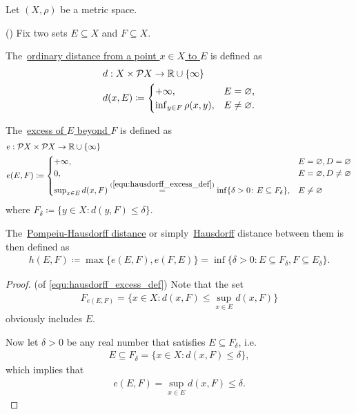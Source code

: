 Let $(X, \rho)$ be a metric space.

\begin{definition}\label{def:hausdorff_distance}(\cite[27]{Dontchev2020})
  Fix two sets $E \subseteq X$ and $F \subseteq X$.

  The~\uline{ordinary distance from a point $x \in X$ to $E$} is defined as
  \begin{align*}
    &d: X \times \mathcal{P} X \to \mathbb{R} \cup \{ \infty \}
    \\
    &d(x, E) \coloneqq \begin{cases}
      +\infty, &E = \varnothing, \\
      \inf_{y \in F} \rho(x, y), &E \neq \varnothing.
    \end{cases}
  \end{align*}

  The~\uline{excess of $E$ beyond $F$} is defined as
  \begin{align}\label{equ:hausdorff_excess_def}
    &e: \PS X \times \PS X \to \R \cup \{ \infty \} \\ \nonumber
    &e(E, F) \coloneqq \begin{cases}
      +\infty, &E = \varnothing, D = \varnothing \\
      0, &E = \varnothing, D \neq \varnothing \\
      \sup_{x \in E} d(x, F) \stackrel{(\ref{equ:hausdorff_excess_def})}{=} \inf \{\delta > 0 \colon E \subseteq F_\delta \}, &E \neq \varnothing \nonumber\refstepcounter{equation}
    \end{cases}
  \end{align}
  where $F_\delta \coloneqq \{ y \in X \colon d(y, F) \leq \delta \}$.

  The~\uline{Pompeiu-Hausdorff distance} or simply~\uline{Hausdorff} distance between them is then defined as
  \begin{align*}
    h(E, F) \coloneqq \max\{ e(E, F), e(F, E) \} = \inf \{\delta > 0 \colon E \subseteq F_\delta, F \subseteq E_\delta \}.
  \end{align*}
\end{definition}
\begin{proof}(of \ref{equ:hausdorff_excess_def})
  Note that the set
  \begin{align*}
    F_{e(E, F)} = \{ x \in X \colon d(x, F) \leq \sup_{x \in E} d(x, F) \}
  \end{align*}
  obviously includes $E$.

  Now let $\delta > 0$ be any real number that satisfies $E \subseteq F_\delta$, i.e.
  \begin{align*}
    E \subseteq F_\delta = \{ x \in X \colon d(x, F) \leq \delta \},
  \end{align*}
  which implies that
  \begin{align*}
    e(E, F) = \sup_{x \in E} d(x, F) \leq \delta.
  \end{align*}
\end{proof}

